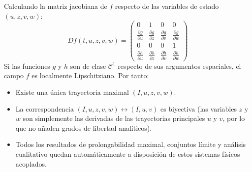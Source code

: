Calculando la matriz jacobiana de $f$ respecto de las variables de estado $(u, z, v, w)$:
\[
    Df(t, u, z, v, w) = \begin{pmatrix}
        0 & 1 & 0 & 0 \\
        \frac{\partial g}{\partial u} & \frac{\partial g}{\partial z} & \frac{\partial g}{\partial v} & \frac{\partial g}{\partial w} \\
        0 & 0 & 0 & 1 \\
        \frac{\partial h}{\partial u} & \frac{\partial h}{\partial z} & \frac{\partial h}{\partial v} & \frac{\partial h}{\partial w}
    \end{pmatrix}
\]
Si las funciones $g$ y $h$ son de clase $\mathcal{C}^1$ respecto de sus argumentos espaciales, el campo $f$ es localmente Lipschitziano. Por tanto:
\begin{itemize}
    \item Existe una única trayectoria maximal $(I, u, z, v, w)$.
    \item La correspondencia $(I, u, z, v, w) \longleftrightarrow (I, u, v)$ es biyectiva (las variables $z$ y $w$ son simplemente las derivadas de las trayectorias principales $u$ y $v$, por lo que no añaden grados de libertad analíticos).
    \item Todos los resultados de prolongabilidad maximal, conjuntos límite y análisis cualitativo quedan automáticamente a disposición de estos sistemas físicos acoplados.
\end{itemize}